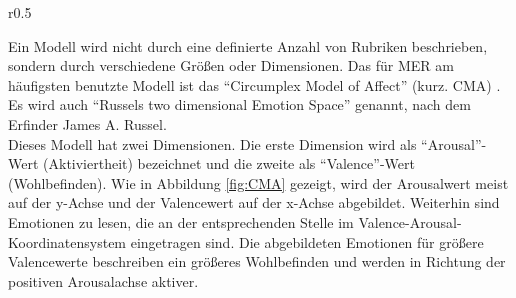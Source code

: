 \documentclass[11pt,a4paper]{article}
\begin{document}
\begin{wrapfigure}{r}{0.5\linewidth}
\centering
{}
\caption[Circumplex Model of Affect]{Circumplex Model of Affect\\(Angelehnt an:\cite[S. 4]{8a02f9c512933d46fbea928d23ac65e38b61b88caba9b38319a5d4952b5a6667} und \cite[S. 7]{russell1980circumplex})}
\label{fig:CMA}
\end{wrapfigure}
\noindent
Ein Modell wird nicht durch eine definierte Anzahl von Rubriken beschrieben, sondern durch verschiedene Größen oder Dimensionen. 
Das für MER am häufigsten benutzte Modell ist das ``Circumplex Model of Affect'' (kurz. CMA) \cite[S. 158 f.]{lerch2012introduction}. Es wird auch ``Russels two dimensional Emotion Space'' genannt, nach dem Erfinder James A. Russel\cite{russell1980circumplex}.\\
Dieses Modell hat zwei Dimensionen. Die erste Dimension wird als ``Arousal''-Wert (Aktiviertheit) bezeichnet und die zweite als ``Valence''-Wert (Wohlbefinden). Wie in Abbildung \ref{fig:CMA} gezeigt, wird der Arousalwert meist auf der y-Achse und der Valencewert auf der x-Achse abgebildet.
Weiterhin sind Emotionen zu lesen, die an der entsprechenden Stelle im Valence-Arousal-Koordinatensystem eingetragen sind. Die abgebildeten Emotionen für größere Valencewerte beschreiben ein größeres Wohlbefinden und werden in Richtung der positiven Arousalachse aktiver.\\
\end{document}
